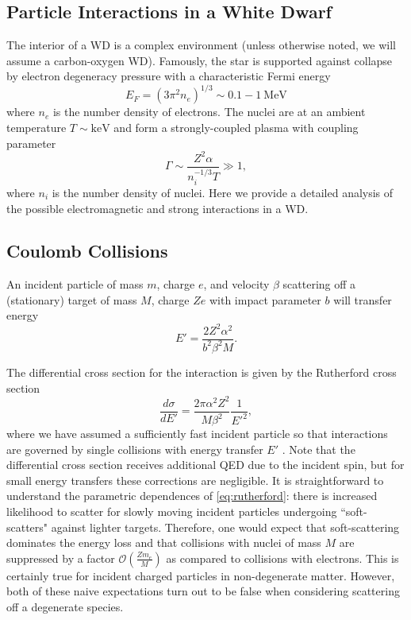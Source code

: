\documentclass[twocolumn,showpacs,preprintnumbers,amsmath,amssymb,prd]{revtex4}
\newcommand{\OO}{\mathcal{O}}
\def\r{\right)}
\def\l{\left(}
\begin{document}
\begin{appendices}

\section{Particle Interactions in a White Dwarf}
\label{sec:appendix}

The interior of a WD is a complex environment (unless otherwise noted, we will assume a carbon-oxygen WD). Famously, the star is supported against collapse by electron degeneracy pressure with a characteristic Fermi energy
\begin{equation}
E_F = (3 \pi^2 n_e)^{1/3} \sim 0.1 - 1 ~\text{MeV}
\end{equation}
where $n_e$ is the number density of electrons. The nuclei are at an ambient temperature $T \sim \text{keV}$ and form a strongly-coupled plasma with coupling parameter
\begin{equation}
\Gamma \sim \frac{Z^2 \alpha}{n_i^{-1/3} T} \gg 1,
\end{equation}
where $n_i$ is the number density of nuclei. Here we provide a detailed analysis of the possible electromagnetic and strong interactions in a WD.

\subsection*{Coulomb Collisions}

An incident particle of mass $m$, charge $e$, and velocity $\beta$ scattering off a (stationary) target of mass $M$, charge $Ze$ with impact parameter $b$ will transfer energy 
\begin{equation}
\label{eq:impact}
E' = \frac{2 Z^2 \alpha^2}{b^2 \beta ^2 M}.
\end{equation}

The differential cross section for the interaction is given by the Rutherford cross section
\begin{equation}
\label{eq:rutherford}
\frac{d \sigma}{dE'} = \frac{2 \pi  \alpha^2 Z^2}{M \beta^2} \frac{1}{E'^2},
 \end{equation}
where we have assumed a sufficiently fast incident particle so that interactions are governed by single collisions with energy transfer $E'$ \cite{Agashe:2014kda}.  Note that the differential cross section receives additional QED due to the incident spin, but for small energy transfers these corrections are negligible. It is straightforward to understand the parametric dependences of \eqref{eq:rutherford}: there is increased likelihood to scatter for slowly moving incident particles undergoing ``soft-scatters" against lighter targets. Therefore, one would expect that soft-scattering dominates the energy loss and that collisions with nuclei of mass $M$ are suppressed by a factor $\OO\l\frac{Z m_e}{M}\r$ as compared to collisions with electrons. This is certainly true for incident charged particles in non-degenerate matter. However, both of these naive expectations turn out to be false when considering scattering off a degenerate species.


\end{appendices}
\end{document}
